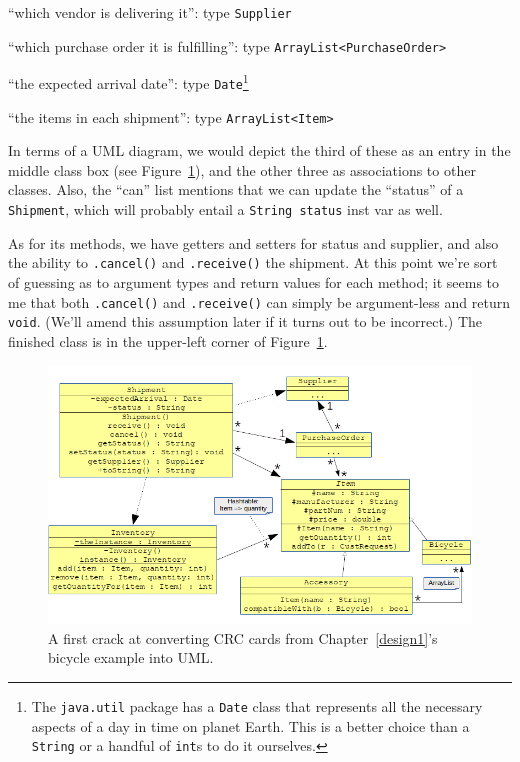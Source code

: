\begin{samepage}
\begin{compactitem}
\item ``which vendor is delivering it'': type \texttt{Supplier}
\item ``which purchase order it is fulfilling'': type
\texttt{ArrayList<PurchaseOrder>}
\item ``the expected arrival date'': type \texttt{Date}\footnote{The
\texttt{java.util} package has a \texttt{Date} class that represents all the
necessary aspects of a day in time on planet Earth. This is a better choice
than a \texttt{String} or a handful of \texttt{int}s to do it ourselves.}
\item ``the items in each shipment'': type \texttt{ArrayList<Item>}
\end{compactitem}
\end{samepage}

In terms of a UML diagram, we would depict the third of these as an entry in
the middle class box (see Figure~\ref{fig:bikeClassDiag}), and the other three
as associations to other classes. Also, the ``can'' list mentions that we can
update the ``status'' of a \texttt{Shipment}, which will probably entail a
\texttt{String status} inst var as well.

As for its methods, we have getters and setters for status and supplier, and
also the ability to \texttt{.cancel()} and \texttt{.receive()} the shipment. At
this point we're sort of guessing as to argument types and return values for
each method; it seems to me that both \texttt{.cancel()} and
\texttt{.receive()} can simply be argument-less and return \texttt{void}. (We'll
amend this assumption later if it turns out to be incorrect.) The finished
class is in the upper-left corner of Figure~\ref{fig:bikeClassDiag}.

\begin{figure}[ht]
\centering
\includegraphics[width=.95\textwidth]{bikeClassDiag.png}
\caption{A first crack at converting CRC cards from Chapter~\ref{design1}'s
bicycle example into UML.}
\label{fig:bikeClassDiag}
\end{figure}

